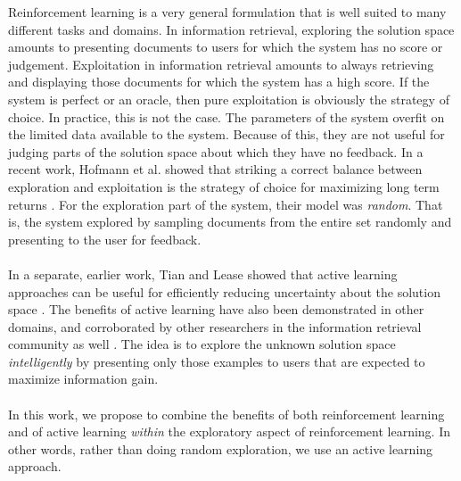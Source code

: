 \documentclass{acm_proc_article-sp}
\begin{document}
Reinforcement learning is a very general formulation that is well suited to many different tasks and domains. In information retrieval, exploring the solution space amounts to presenting documents to users for which the system has no score or judgement. Exploitation in information retrieval amounts to always retrieving and displaying those documents for which the system has a high score. If the system is perfect or an oracle, then pure exploitation is obviously the strategy of choice. In practice, this is not the case. The parameters of the system overfit on the limited data available to the system. Because of this, they are not useful for judging parts of the solution space about which they have no feedback. In a recent work, Hofmann et al. showed that striking a correct balance between exploration and exploitation is the strategy of choice for maximizing long term returns \cite{hofmann}. For the exploration part of the system, their model was \emph{random}. That is, the system explored by sampling documents from the entire set randomly and presenting to the user for feedback. \\ \\
In a separate, earlier work, Tian and Lease showed that active learning approaches can be useful for efficiently reducing uncertainty about the solution space \cite{aibo}. The benefits of active learning have also been demonstrated in other domains, and corroborated by other researchers in the information retrieval community as well \cite{active2}. The idea is to explore the unknown solution space \emph{intelligently} by presenting only those examples to users that are expected to maximize information gain. \\ \\
In this work, we propose to combine the benefits of both reinforcement learning and of active learning \emph{within} the exploratory aspect of reinforcement learning. In other words, rather than doing random exploration, we use an active learning approach. \\ \\
\end{document}
